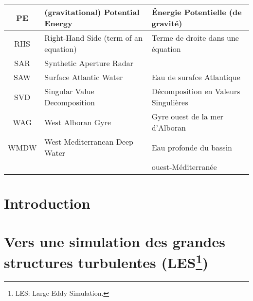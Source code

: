 \documentclass[a4paper,12pt,notitlepage,twoside]{report}
\numberwithin{equation}{section}
\begin{document}
\begin{table}[!h]
\begin{tabular}{|c|ll|}
                \hline
                PE & (gravitational) Potential Energy & Énergie Potentielle (de gravité)\\
                \hline
                RHS & Right-Hand Side (term of an equation) & Terme de droite dans une équation \\
                \hline
                SAR & Synthetic Aperture Radar & \\
                \hline
                SAW & Surface Atlantic Water & Eau de surafce Atlantique\\
                \hline
                SVD & Singular Value Decomposition & Décomposition en Valeurs Singulières  \\
                \hline
                WAG & West Alboran Gyre & Gyre ouest de la mer d'Alboran\\
                \hline
                WMDW & West Mediterranean Deep Water & Eau profonde du bassin\\
                & &ouest-Méditerranée\\
                \hline
        \end{tabular}
\end{table}


\newpage
\chapter{Introduction}
\label{chapINTRO}




\chapter[Vers une simulation des grandes structures turbulentes]{Vers une simulation des grandes structures turbulentes (LES\footnote{LES: Large Eddy Simulation.\label{LES}})}
\label{chap2}
\end{document}
